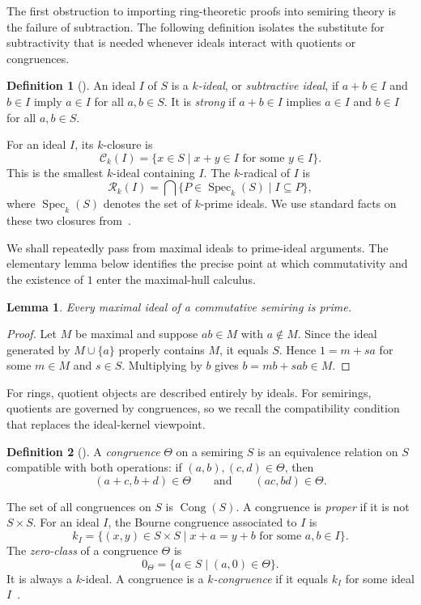 \documentclass[11pt,leqno]{amsart}
\theoremstyle{plain}
\newtheorem{lemma}[theorem]{Lemma}
\theoremstyle{definition}
\newtheorem{definition}{Definition}[section]
\theoremstyle{remark}
\numberwithin{equation}{section}
\DeclareMathOperator{\Spec}{Spec}
\DeclareMathOperator{\Cong}{Cong}
\newcommand{\zero}[1]{0_{#1}}
\begin{document}
The first obstruction to importing ring-theoretic proofs into semiring
theory is the failure of subtraction.
The following definition isolates the substitute for subtractivity
that is needed whenever ideals interact with quotients or congruences.

\begin{definition}[\cite{Golan/Book}]
An ideal $I$ of $S$ is a \emph{$k$-ideal}, or
\emph{subtractive ideal}, if $a+b\in I$ and $b\in I$ imply $a\in I$
for all $a,b\in S$.  It is \emph{strong} if $a+b\in I$ implies
$a\in I$ and $b\in I$ for all $a,b\in S$.
\end{definition}

For an ideal $I$, its $k$-closure is
\[
\mathcal C_k(I)=\{x\in S\mid x+y\in I\text{ for some }y\in I\}.
\]
This is the smallest $k$-ideal containing $I$.
The $k$-radical of $I$ is
\[
\mathcal R_k(I)=\bigcap\{P\in\Spec_k(S)\mid I\subseteq P\},
\]
where $\Spec_k(S)$ denotes the set of $k$-prime ideals.
We use standard facts on these two closures from~\cite{AG24}.

We shall repeatedly pass from maximal ideals to prime-ideal arguments.
The elementary lemma below identifies the precise point at which
commutativity and the existence of $1$ enter the maximal-hull calculus.

\begin{lemma}\label{lem:max-prime}
Every maximal ideal of a commutative semiring is prime.
\end{lemma}
\begin{proof}
Let $M$ be maximal and suppose $ab\in M$ with $a\notin M$.
Since the ideal generated by $M\cup\{a\}$ properly contains $M$,
it equals $S$.  Hence $1=m+sa$ for some $m\in M$ and $s\in S$.
Multiplying by $b$ gives $b=mb+sab\in M$.
\end{proof}

For rings, quotient objects are described entirely by ideals.
For semirings, quotients are governed by congruences, so we recall
the compatibility condition that replaces the ideal-kernel viewpoint.

\begin{definition}[\cite{Golan/Book}]
A \emph{congruence} $\Theta$ on a semiring $S$ is an equivalence
relation on $S$ compatible with both operations:
if $(a,b),(c,d)\in\Theta$, then
\[
(a+c,b+d)\in\Theta\qquad\text{and}\qquad(ac,bd)\in\Theta.
\]
\end{definition}

The set of all congruences on $S$ is $\Cong(S)$.
A congruence is \emph{proper} if it is not $S\times S$.
For an ideal $I$, the Bourne congruence associated to $I$ is
\[
k_I=\{(x,y)\in S\times S\mid x+a=y+b\text{ for some }a,b\in I\}.
\]
The \emph{zero-class} of a congruence $\Theta$ is
\[
\zero\Theta=\{a\in S\mid (a,0)\in\Theta\}.
\]
It is always a $k$-ideal.
A congruence is a \emph{$k$-congruence} if it equals $k_I$ for
some ideal $I$~\cite{Han-k-congruence}.
\end{document}
